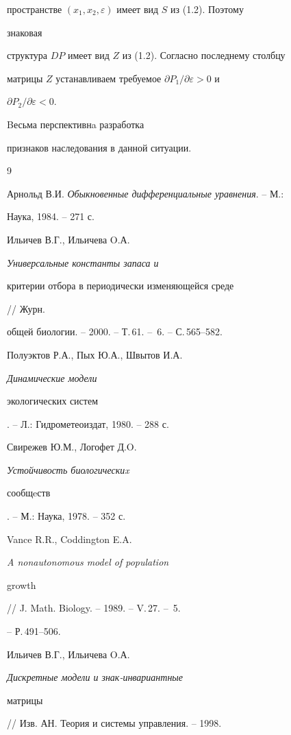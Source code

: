 пространстве $(x_1,x_2,\varepsilon)$ имеет вид $S$ из (1.2). Поэтому 


знаковая 


структура $D P$ имеет вид $Z$ из (1.2). Согласно последнему столбцу 


матрицы $Z$ устанавливаем требуемое $\partial P_1/\partial\varepsilon>0$ и 


$\partial P_2/\partial\varepsilon<0$. 


Bесьма перспективнa разработка 


признаков наследования в данной ситуации. 


 


 


\begin{thebibliography}{9} 


 




Арнольд В.И. {\em Обыкновенные дифференциальные уравнения}. -- М.: 


Наука, 1984. -- 271 с. 




Ильичев В.Г., Ильичева O.А. {\em Универсальные константы запаса и 


критерии отбора в периодически изменяющейся среде} // Журн. 


общей биологии. -- 2000. -- Т.\,61. -- \No\,6. -- С.\,565--582. 




Полуэктов Р.А., Пых Ю.А., Швытов И.А. {\em Динамические модели 


экологических систем}. -- Л.: Гидрометеоиздат, 1980. -- 288 с. 




Свирежев Ю.М., Логофет Д.O. {\em Устойчивость биологическиx 


сообщeств}. -- М.: Наука, 1978. -- 352 с. 




Vance R.R., Coddington E.A. {\em A nonautonomous model of population 


growth} // J. Math. Biology. -- 1989. -- V.\,27. -- \No\,5. 


-- Р.\,491--506. 




Ильичев В.Г., Ильичева O.А. {\em Дискретные модели и знак-инвариантные 


матрицы} // Изв. АН. Теория и системы управления. -- 1998. 



\end{thebibliography}
